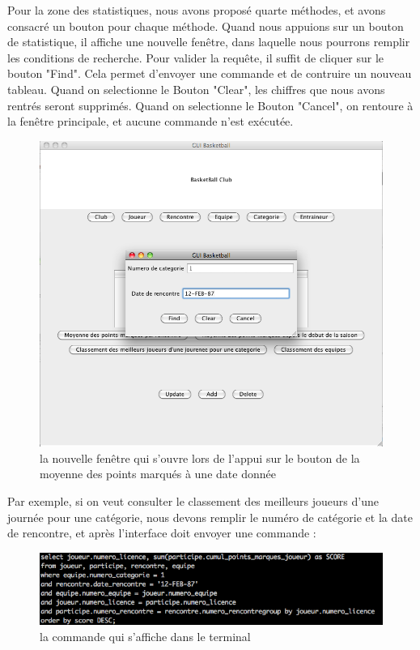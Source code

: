 \documentclass{article}
\begin{document}
 \newpage
Pour la zone des statistiques, nous avons proposé quarte méthodes, et avons consacré un bouton pour chaque méthode. Quand nous appuions sur un bouton de statistique, il affiche une nouvelle fenêtre, dans laquelle nous pourrons remplir les conditions de recherche. Pour valider la requête, il suffit de cliquer sur le bouton "Find". Cela permet d'envoyer une commande et de contruire un nouveau tableau. Quand on selectionne le Bouton "Clear", les chiffres que nous avons rentrés seront supprimés. Quand on selectionne le Bouton "Cancel", on rentoure à la fenêtre principale, et aucune commande n'est exécutée. \\
 
\begin{figure}[!h]
\centering
\includegraphics[scale = 0.4] {2.png}
\caption{la nouvelle fenêtre qui s'ouvre lors de l'appui sur le bouton de la moyenne des points marqués à une date donnée }
\end{figure}

\newpage

Par exemple, si on veut consulter le classement des meilleurs joueurs d'une journée pour une catégorie, nous devons remplir le numéro de catégorie et la date de rencontre, et après l'interface doit envoyer une commande : \\


\begin{figure}[!h]
\centering
\includegraphics[scale = 0.5] {3.png}
\caption{la commande qui s'affiche dans le terminal}
\end{figure}
\end{document}
